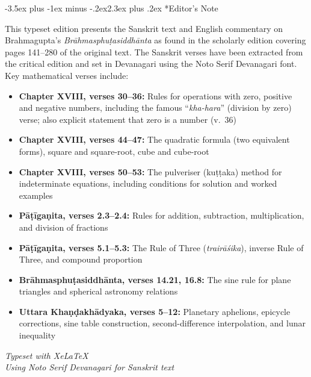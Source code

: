 \documentclass[11pt,a4paper]{article}
\makeatletter
\renewcommand{\section}{\@startsection {section}{1}{\z@}%
  {-3.5ex plus -1ex minus -.2ex}{2.3ex plus .2ex}%
  {\normalfont\Large\bfseries\color{sectioncolor}}}
\makeatother
\begin{document}
\section*{Editor's Note}

This typeset edition presents the Sanskrit text and English commentary on Brahmagupta's \textit{Brāhmasphuṭasiddhānta} as found in the scholarly edition covering pages 141--280 of the original text. The Sanskrit verses have been extracted from the critical edition and set in Devanagari using the Noto Serif Devanagari font. Key mathematical verses include:

\begin{itemize}
\item \textbf{Chapter XVIII, verses 30--36:} Rules for operations with zero, positive and negative numbers, including the famous ``\textit{kha-hara}'' (division by zero) verse; also explicit statement that zero is a number (v.\ 36)
\item \textbf{Chapter XVIII, verses 44--47:} The quadratic formula (two equivalent forms), square and square-root, cube and cube-root
\item \textbf{Chapter XVIII, verses 50--53:} The pulveriser (kuṭṭaka) method for indeterminate equations, including conditions for solution and worked examples
\item \textbf{Pāṭīgaṇita, verses 2.3--2.4:} Rules for addition, subtraction, multiplication, and division of fractions
\item \textbf{Pāṭīgaṇita, verses 5.1--5.3:} The Rule of Three (\textit{trairāśika}), inverse Rule of Three, and compound proportion
\item \textbf{Brāhmasphuṭasiddhānta, verses 14.21, 16.8:} The sine rule for plane triangles and spherical astronomy relations
\item \textbf{Uttara Khaṇḍakhādyaka, verses 5--12:} Planetary aphelions, epicycle corrections, sine table construction, second-difference interpolation, and lunar inequality
\end{itemize}

\vspace{1cm}
\begin{flushright}
\textit{Typeset with XeLaTeX}\\
\textit{Using Noto Serif Devanagari for Sanskrit text}
\end{flushright}
\end{document}
